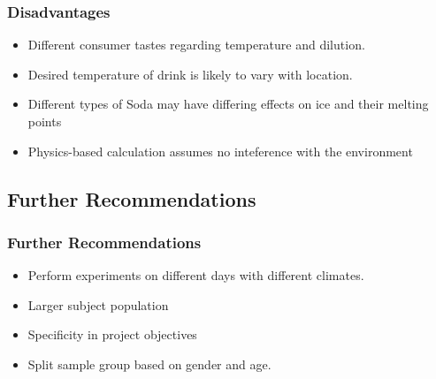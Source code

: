 \documentclass[compress,handout,10pt]{beamer}
\let\olditem\item
\renewcommand{\item}{\setlength{\itemsep}{0.5\baselineskip}\olditem}
\begin{document}
\begin{frame}
    \frametitle{Disadvantages}

\begin{itemize}
\item Different consumer tastes regarding temperature and dilution. 
\item Desired temperature of drink is likely to vary with location.
\item Different types of Soda may have differing effects on ice and their melting points
\item Physics-based calculation assumes no inteference with the environment
\end{itemize}

\end{frame}
 

\subsection{Further Recommendations}
\begin{frame}
    \frametitle{Further Recommendations}
\begin{itemize}
\item Perform experiments on different days with different climates.
\item Larger subject population
\item Specificity in project objectives 
\item Split sample group based on gender and age.
\end{itemize}
\end{frame}

\begin{frame}[plain]
    \titlepage
\end{frame}
\end{document}
